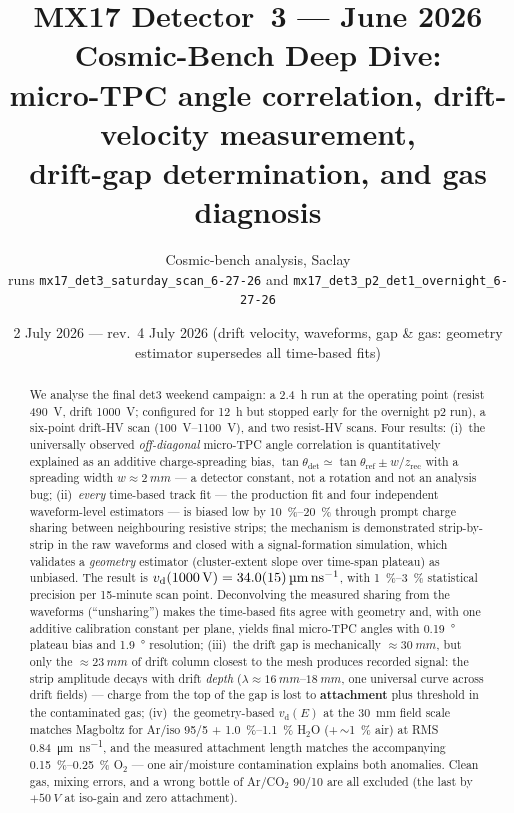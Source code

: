 \documentclass[11pt,a4paper]{article}
\title{\textbf{MX17 Detector~3 --- June 2026 Cosmic-Bench Deep Dive:}\\[2mm]
       micro-TPC angle correlation, drift-velocity measurement,\\
       drift-gap determination, and gas diagnosis}
\author{Cosmic-bench analysis, Saclay\\[1mm]
        \small runs \texttt{mx17\_det3\_saturday\_scan\_6-27-26} and
        \texttt{mx17\_det3\_p2\_det1\_overnight\_6-27-26}}
\date{2 July 2026 --- rev.\ 4 July 2026 (drift velocity, waveforms, gap \&
gas: geometry estimator supersedes all time-based fits)}
\newcommand{\vd}{v_{\mathrm{d}}}
\newcommand{\thref}{\theta_{\mathrm{ref}}}
\newcommand{\thdet}{\theta_{\mathrm{det}}}
\newcommand{\umns}{\micro\meter\per\nano\second}
\begin{document}
\maketitle

\begin{abstract}
\noindent
We analyse the final det3 weekend campaign: a \SI{2.4}{h} run at the
operating point (resist \SI{490}{V}, drift \SI{1000}{V}; configured for
\SI{12}{h} but stopped early for the overnight p2 run), a six-point drift-HV
scan (\SIrange{100}{1100}{V}), and two resist-HV scans.  Four results:
(i)~the universally observed \emph{off-diagonal} micro-TPC angle correlation is
quantitatively explained as an additive charge-spreading bias,
\(\tan\thdet \simeq \tan\thref \pm w/z_{\mathrm{rec}}\) with a spreading
width \(w \approx \SI{2}{mm}\) --- a detector constant, not a rotation and
not an analysis bug;
(ii)~\emph{every} time-based track fit --- the production fit and four
independent waveform-level estimators --- is biased low by
\SIrange{10}{20}{\percent} through prompt charge sharing between
neighbouring resistive strips; the mechanism is demonstrated strip-by-strip
in the raw waveforms and closed with a signal-formation simulation, which
validates a \emph{geometry} estimator (cluster-extent slope over time-span
plateau) as unbiased.  The result is
\(\vd(\SI{1000}{V}) = \SI{34 \pm 1.5}{\umns}\), with
\SIrange{1}{3}{\percent} statistical precision per 15-minute scan point.
Deconvolving the measured sharing from the waveforms (``unsharing'') makes
the time-based fits agree with geometry and, with one additive calibration
constant per plane, yields final micro-TPC angles with
\SI{0.19}{\degree} plateau bias and \SI{1.9}{\degree} resolution;
(iii)~the drift gap is mechanically \(\approx\SI{30}{mm}\), but only the
\(\approx\SI{23}{mm}\) of drift column closest to the mesh produces
recorded signal: the strip amplitude decays with drift \emph{depth}
(\(\lambda \approx \SIrange{16}{18}{mm}\), one universal curve across
drift fields) --- charge from the top of the gap is lost to
\textbf{attachment} plus threshold in the contaminated gas;
(iv)~the geometry-based \(\vd(E)\) at the \SI{30}{mm} field scale matches
Magboltz for Ar/iso 95/5 + \SIrange{1.0}{1.1}{\percent} H\(_2\)O
(+\,$\sim$\SI{1}{\percent} air) at RMS \SI{0.84}{\umns}, and the measured
attachment length matches the accompanying
\SIrange{0.15}{0.25}{\percent} O\(_2\) --- one air/moisture contamination
explains both anomalies.  Clean gas, mixing errors, and a wrong bottle of
Ar/CO\(_2\) 90/10 are all excluded (the last by \(+\SI{50}{V}\) at iso-gain
and zero attachment).
\end{abstract}
\end{document}
